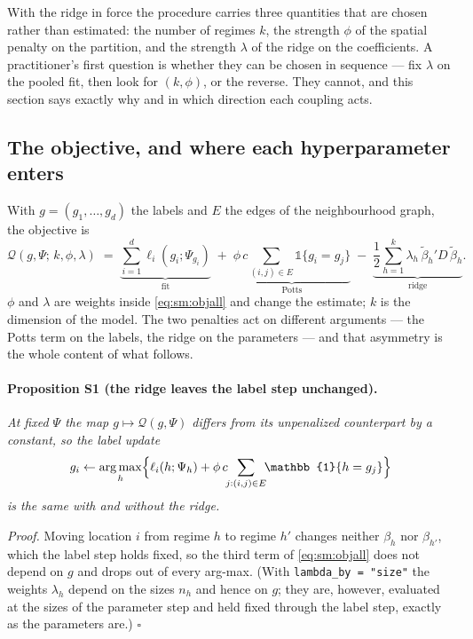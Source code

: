 \documentclass[11pt]{article}
\DeclareMathOperator*{\argmax}{arg\,max}
\begin{document}
With the ridge in force the procedure carries three quantities that are chosen rather than estimated: the number of regimes $k$, the strength $\phi$ of the spatial penalty on the partition, and the strength $\lambda$ of the ridge on the coefficients. A practitioner's first question is whether they can be chosen in sequence --- fix $\lambda$ on the pooled fit, then look for $(k,\phi)$, or the reverse. They cannot, and this section says exactly why and in which direction each coupling acts.

\subsection{The objective, and where each hyperparameter enters}

With $g = (g_1,\dots,g_d)$ the labels and $E$ the edges of the neighbourhood graph, the objective is
\begin{equation}\label{eq:sm:objall}
  \mathcal{Q}(g,\Psi;\,k,\phi,\lambda)
  \;=\; \underbrace{\sum_{i=1}^{d}\ell_i(g_i;\Psi_{g_i})}_{\text{fit}}
  \;+\; \underbrace{\phi\,c\!\!\sum_{(i,j)\in E}\!\!\mathbb{1}\{g_i = g_j\}}_{\text{Potts}}
  \;-\; \underbrace{\frac{1}{2}\sum_{h=1}^{k}\lambda_h\,\tilde\beta_h' D\,\tilde\beta_h}_{\text{ridge}} .
\end{equation}
$\phi$ and $\lambda$ are weights inside \eqref{eq:sm:objall} and change the estimate; $k$ is the dimension of the model. The two penalties act on different arguments --- the Potts term on the labels, the ridge on the parameters --- and that asymmetry is the whole content of what follows.

\paragraph{Proposition S1 (the ridge leaves the label step unchanged).} \emph{At fixed $\Psi$ the map $g \mapsto \mathcal{Q}(g,\Psi)$ differs from its unpenalized counterpart by a constant, so the label update
\[
  g_i \leftarrow \argmax_h \Bigl\{\ell_i(h;\Psi_h) + \phi\,c\!\!\sum_{j:(i,j)\in E}\!\!\mathbb{1}\{h = g_j\}\Bigr\}
\]
is the same with and without the ridge.}

\emph{Proof.} Moving location $i$ from regime $h$ to regime $h'$ changes neither $\beta_h$ nor $\beta_{h'}$, which the label step holds fixed, so the third term of \eqref{eq:sm:objall} does not depend on $g$ and drops out of every arg-max. (With \texttt{lambda\_by = "size"} the weights $\lambda_h$ depend on the sizes $n_h$ and hence on $g$; they are, however, evaluated at the sizes of the parameter step and held fixed through the label step, exactly as the parameters are.) $\square$
\end{document}
